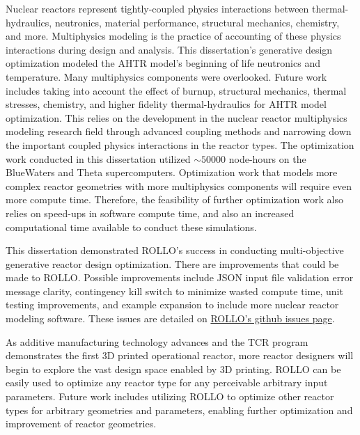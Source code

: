Nuclear reactors represent tightly-coupled physics interactions between 
thermal-hydraulics, neutronics, material performance, structural mechanics, chemistry, 
and more. 
Multiphysics modeling is the practice of accounting of these physics interactions 
during design and analysis. 
This dissertation's generative design optimization modeled the \gls{AHTR} model's 
beginning of life neutronics and temperature. 
Many multiphysics components were overlooked. 
Future work includes taking into account the effect of burnup, structural mechanics, 
thermal stresses, chemistry, and higher fidelity thermal-hydraulics for \gls{AHTR} 
model optimization. 
This relies on the development in the nuclear reactor multiphysics modeling research 
field through advanced coupling methods and narrowing down the important coupled 
physics interactions in the reactor types. 
The optimization work conducted in this dissertation utilized $\sim 50000$ node-hours 
on the BlueWaters and Theta supercomputers. 
Optimization work that models more complex reactor geometries with more 
multiphysics components will require even more compute time. 
Therefore, the feasibility of further optimization work also relies on speed-ups 
in software compute time, and also an increased computational time available to 
conduct these simulations. 

This dissertation demonstrated \gls{ROLLO}'s success in conducting multi-objective 
generative reactor design optimization. 
There are improvements that could be made to \gls{ROLLO}. 
Possible improvements include JSON input file validation error message clarity, 
contingency kill switch to minimize wasted compute time, unit testing improvements, 
and example expansion to include more nuclear reactor modeling software.  
These issues are detailed on 
\hyperlink{https://github.com/arfc/rollo/issue}{ROLLO's github issues page}. 

As additive manufacturing technology advances and the \gls{TCR} program 
demonstrates the first 3D printed operational reactor, more reactor designers 
will begin to explore the vast design space enabled by 3D printing. 
\gls{ROLLO} can be easily used to optimize any reactor type for any perceivable 
arbitrary input parameters. 
Future work includes utilizing \gls{ROLLO} to optimize other reactor types for arbitrary
geometries and parameters, enabling further optimization and improvement of reactor 
geometries.


